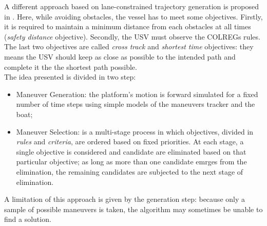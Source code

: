 \documentclass[journal]{IEEEtran}
\begin{document}
              A different approach based on lane-constrained trajectory generation is proposed in \cite{Tan2010}. Here, while avoiding obstacles, the vessel has to meet some objectives. Firstly, it is required to maintain a minimum distance from each obstacles at all times (\textit{safety distance} objective). Secondly, the USV must observe the COLREGs rules. The last two objectives are called \textit{cross track} and \textit{shortest time} objectives: they means the USV should keep as close as possible to the intended path and complete it the the shortest path possible.\\
              The idea presented is divided in two step:
                    \begin{itemize}
                          \item Maneuver Generation: the platform's motion is forward simulated for a fixed number of time steps using simple models of the maneuvers tracker and the boat;
                          \item Maneuver Selection: is a multi-stage process in which objectives, divided in \textit{rules} and \textit{criteria}, are ordered based on fixed priorities. At each stage, a single objective is considered and candidate are eliminated based on that particular objective; as long as more than one candidate emrges from the elimination, the remaining candidates are subjected to the next stage of elimination.
                    \end{itemize}
              A limitation of this approach is given by the generation step: because only a sample of possible maneuvers is taken, the algorithm may sometimes be unable to find a solution.\\
\end{document}
